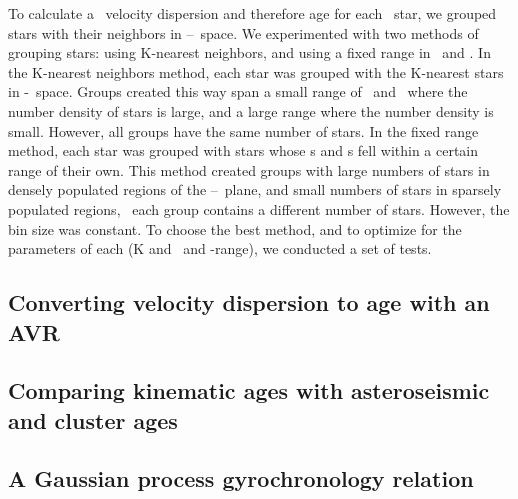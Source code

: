 To calculate a \vz\ velocity dispersion and therefore age for each \kepler\
star, we grouped stars with their neighbors in
\logp--\teff\ space.
We experimented with two methods of grouping stars: using K-nearest neighbors,
and using a fixed range in \logp\ and \teff.
In the K-nearest neighbors method, each star was grouped with the K-nearest
stars in \logp-\teff\ space.
Groups created this way span a small range of \logp\ and \teff\ where the
number density of stars is large, and a large range where the number density
is small.
However, all groups have the same number of stars.
In the fixed range method, each star was grouped with stars whose \logp s and
\teff s fell within a certain range of their own.
This method created groups with large numbers of stars in densely populated
regions of the \logp--\teff\ plane, and small numbers of stars in sparsely
populated regions, \ie\ each group contains a different number of stars.
However, the bin size was constant.
To choose the best method, and to optimize for the parameters of each (K and
\logp\ and \teff-range), we conducted a set of tests.

\subsection{Converting velocity dispersion to age with an AVR}
\label{sec:avr}

\subsection{Comparing kinematic ages with asteroseismic and cluster ages}


\subsection{A Gaussian process gyrochronology relation}
\label{sec:gp_model}
